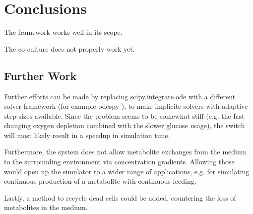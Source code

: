 \section{Conclusions}\label{sec:conclusions}
	The framework works well in its scope.
	
	The co-culture does not properly work yet.
	\subsection{Further Work}
		Further efforts can be made by replacing scipy.integrate.ode with a
		different solver framework (for example odespy \cite{odespy}), to make implicite solvers with adaptive step-sizes available.
		Since the problem seems to be somewhat stiff (e.g. the fast changing oxygen depletion combined with the slower glucose usage),
		the switch will most likely result in a speedup in simulation time.
		
		Furthermore, the system does not allow metabolite exchanges from the medium to the surrounding environment via concentration gradients.
		Allowing those would open up the simulator to a wider range of applications, e.g. for simulating continuous production of a metabolite with
		continuous feeding.
		
		Lastly, a method to recycle dead cells could be added, countering the loss of metabolites in the medium.

